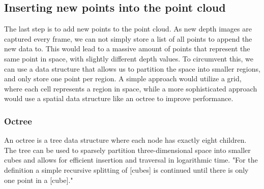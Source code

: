 



\subsection{Inserting new points into the point cloud}

The last step is to add new points to the point cloud.
As new depth images are captured every frame, we can not simply store a list of all points to append the new data to.
This would lead to a massive amount of points that represent the same point in space, with slightly different depth values.
To circumvent this, we can use a data structure that allows us to partition the space into smaller regions, and only store one point per region.
A simple approach would utilize a grid, where each cell represents a region in space, while a more sophisticated approach
would use a spatial data structure like an octree to improve performance.

\subsubsection{Octree}
An octree is a tree data structure where each node has exactly eight children.
The tree can be used to sparsely partition three-dimensional space into smaller cubes and allows for efficient
insertion and traversal in logarithmic time.
"For the definition a simple recursive splitting of [cubes] is continued until there is only one point in a [cube]."
\parencite{gabriel_zachmann_geometric_2002}

